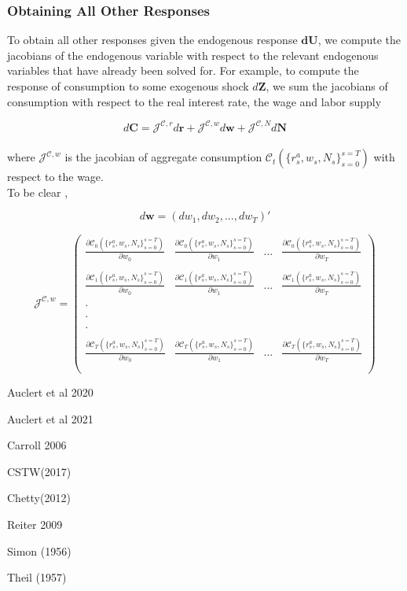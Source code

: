 \documentclass[titlepage]{\econtex}\providecommand{\texname}{BufferStockTheory}
\begin{document}
 
 
 
\hypertarget{Obtaining All Other Responses}{}
\subsubsection{Obtaining All Other Responses} 

To obtain all other responses given the endogenous response $\mathbf{dU}$, we compute the jacobians of the endogenous variable with respect to the relevant endogenous variables that have already been solved for.  For example, to compute the response of consumption to some exogenous shock $d\mathbf{Z}$, we sum  the jacobians of consumption with respect to the real interest rate, the wage and labor supply 

$$ d\mathbf{C} = \mathcal{J}^{\mathcal{C} , r} d\mathbf{r} +\mathcal{J}^{\mathcal{C} , w} d\mathbf{w} +\mathcal{J}^{\mathcal{C} , N} d\mathbf{N} $$\\
 
 where $\mathcal{J}^{\mathcal{C} , w} $ is the jacobian of aggregate consumption  $\mathcal{C}_{t}(\{r_{s}^{a} ,w_{s}, N_{s}\}_{s=0}^{s=T}) $  with respect to the wage. \\
 
 To be clear , 
 
$$d\mathbf{w} =  ( dw_{1}, dw_{2}, . . . , dw_{T})' $$
 
 
 
 $$\mathcal{J}^{\mathcal{C} , w} =   \begin{pmatrix} 
\frac{ \partial \mathcal{C}_{0}(\{r_{s}^{a} ,w_{s}, N_{s}\}_{s=0}^{s=T})}{\partial w_{0}}  & \frac{ \partial \mathcal{C}_{0}(\{r_{s}^{a} ,w_{s}, N_{s}\}_{s=0}^{s=T})}{\partial w_{1}}&    ... & \frac{ \partial \mathcal{C}_{0}(\{r_{s}^{a} ,w_{s}, N_{s}\}_{s=0}^{s=T})}{\partial w_{T}} \\ \\ 
\frac{ \partial \mathcal{C}_{1}(\{r_{s}^{a} ,w_{s}, N_{s}\}_{s=0}^{s=T})}{\partial w_{0}}  &\frac{ \partial \mathcal{C}_{1}(\{r_{s}^{a} ,w_{s}, N_{s}\}_{s=0}^{s=T})}{\partial w_{1}}& ... & \frac{ \partial \mathcal{C}_{1}(\{r_{s}^{a} ,w_{s}, N_{s}\}_{s=0}^{s=T})}{\partial w_{T}} \\ \\
.  \\ \\
.  \\ \\
. \\ \\
\frac{ \partial \mathcal{C}_{T}(\{r_{s}^{a} ,w_{s}, N_{s}\}_{s=0}^{s=T})}{\partial w_{0}}  &\frac{ \partial \mathcal{C}_{T}(\{r_{s}^{a} ,w_{s}, N_{s}\}_{s=0}^{s=T})}{\partial w_{1}}& ... & \frac{ \partial \mathcal{C}_{T}(\{r_{s}^{a} ,w_{s}, N_{s}\}_{s=0}^{s=T})}{\partial w_{T}}  \\ \\
 \end{pmatrix} $$
 
 



Auclert et al 2020

Auclert et al 2021

Carroll 2006

CSTW(2017)

 Chetty(2012)

Reiter 2009

Simon (1956)

Theil (1957)
\end{document}
